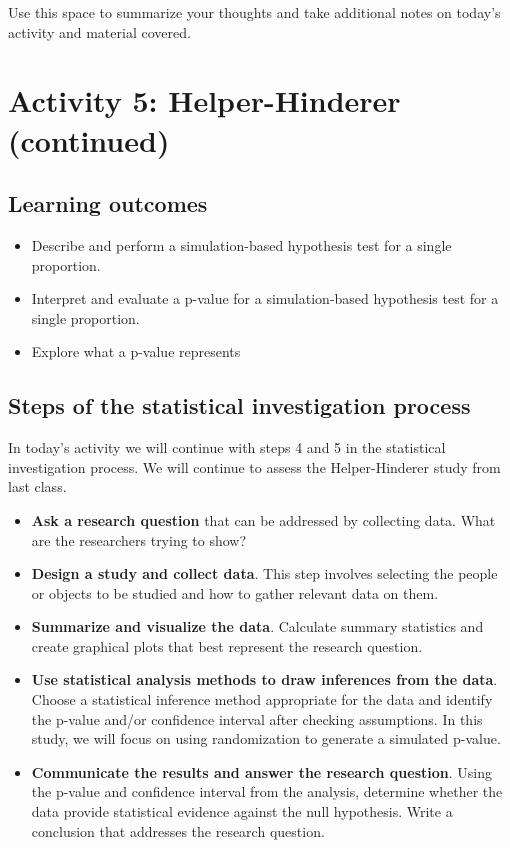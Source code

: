 \documentclass[
]{report}
\begin{document}
Use this space to summarize your thoughts and take additional notes on today's activity and material covered.

\newpage

\section{Activity 5: Helper-Hinderer (continued)}\label{activity-5-helper-hinderer-continued}


\subsection{Learning outcomes}\label{learning-outcomes-4}

\begin{itemize}
\item
  Describe and perform a simulation-based hypothesis test for a single proportion.
\item
  Interpret and evaluate a p-value for a simulation-based hypothesis test for a single proportion.
\item
  Explore what a p-value represents
\end{itemize}

\subsection{Steps of the statistical investigation process}\label{steps-of-the-statistical-investigation-process-2}

In today's activity we will continue with steps 4 and 5 in the statistical investigation process. We will continue to assess the Helper-Hinderer study from last class.

\begin{itemize}
\item
  \textbf{Ask a research question} that can be addressed by collecting data. What are the researchers trying to show?
\item
  \textbf{Design a study and collect data}. This step involves selecting the people or objects to be studied and how to gather relevant data on them.
\item
  \textbf{Summarize and visualize the data}. Calculate summary statistics and create graphical plots that best represent the research question.
\item
  \textbf{Use statistical analysis methods to draw inferences from the data}. Choose a statistical inference method appropriate for the data and identify the p-value and/or confidence interval after checking assumptions. In this study, we will focus on using randomization to generate a simulated p-value.
\item
  \textbf{Communicate the results and answer the research question}. Using the p-value and confidence interval from the analysis, determine whether the data provide statistical evidence against the null hypothesis. Write a conclusion that addresses the research question.
\end{itemize}
\end{document}
